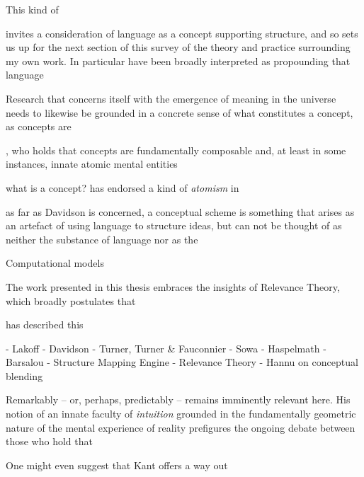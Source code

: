 This kind of 

invites a consideration of language as a concept supporting structure, and so sets us up for the next section of this survey of the theory and practice surrounding my own work.  In particular \cite{Whorf} have been broadly interpreted as propounding that language 

Research that concerns itself with the emergence of meaning in the universe needs to likewise be grounded in a concrete sense of what constitutes a concept, as concepts are

\cite{Fodor}, who holds that concepts are fundamentally composable and, at least in some instances, innate atomic mental entities

what is a concept?  \cite{Fodor} has endorsed a kind of \emph{atomism} in 

\citep[cf][for a case against conceptual schema in general]{Davidson}

as far as Davidson is concerned, a conceptual scheme is something that arises as an artefact of using language to structure ideas, but can not be thought of as neither the substance of language nor as the 

Computational models 

The work presented in this thesis embraces the insights of Relevance Theory, which broadly postulates that 

\cite{Carston} has described this 

- Lakoff
- Davidson
- Turner, Turner \& Fauconnier
- Sowa
- Haspelmath
- Barsalou
- Structure Mapping Engine
- Relevance Theory
- Hannu on conceptual blending

Remarkably -- or, perhaps, predictably -- \cite{Kant} remains imminently relevant here.  His notion of an innate faculty of \emph{intuition} grounded in the fundamentally geometric nature of the mental experience of reality prefigures the ongoing debate between those who hold that 

One might even suggest that Kant offers a way out 

